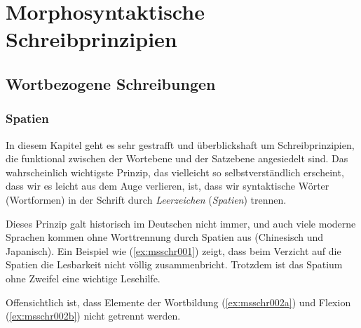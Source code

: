 \chapter{Morphosyntaktische Schreibprinzipien}

\label{sec:andereschrift}

\section{Wortbezogene Schreibungen}

\subsection{Spatien}

\label{sec:spatien}

In diesem Kapitel geht es sehr gestrafft und überblickshaft um Schreibprinzipien, die funktional zwischen der Wortebene und der Satzebene angesiedelt sind.
Das wahrscheinlich wichtigste Prinzip, das vielleicht so selbstverständlich erscheint, dass wir es leicht aus dem Auge verlieren, ist, dass wir syntaktische Wörter (Wortformen) in der Schrift durch \textit{Leerzeichen} (\textit{Spatien}) trennen.


Dieses Prinzip galt historisch im Deutschen nicht immer, und auch viele moderne Sprachen kommen ohne Worttrennung durch Spatien aus (\zB Chinesisch und Japanisch).
Ein Beispiel wie (\ref{ex:msschr001}) zeigt, dass beim Verzicht auf die Spatien die Lesbarkeit nicht völlig zusammenbricht.
Trotzdem ist das Spatium ohne Zweifel eine wichtige Lesehilfe.

\begin{exe}
\end{exe}

Offensichtlich ist, dass Elemente der Wortbildung (\ref{ex:msschr002a}) und Flexion (\ref{ex:msschr002b}) nicht getrennt werden.

\begin{exe}
  \ex\label{ex:msschr002} 
  \begin{xlist}
  \end{xlist}
\end{exe}

